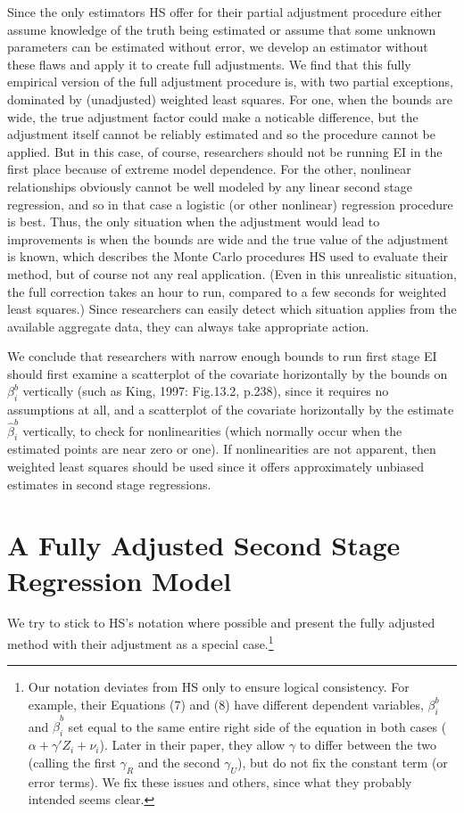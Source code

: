 \documentclass[11pt,titlepage]{article}
\begin{document}
Since the only estimators HS offer for their partial adjustment
procedure either assume knowledge of the truth being estimated or
assume that some unknown parameters can be estimated without error, we
develop an estimator without these flaws and apply it to create full
adjustments.  We find that this fully empirical version of the full
adjustment procedure is, with two partial exceptions, dominated by
(unadjusted) weighted least squares.  For one, when the bounds are
wide, the true adjustment factor could make a noticable difference,
but the adjustment itself cannot be reliably estimated and so the
procedure cannot be applied.  But in this case, of course, researchers
should not be running EI in the first place because of extreme model
dependence.  For the other, nonlinear relationships obviously cannot
be well modeled by any linear second stage regression, and so in that
case a logistic (or other nonlinear) regression procedure is best.
Thus, the only situation when the adjustment would lead to
improvements is when the bounds are wide and the true value of the
adjustment is known, which describes the Monte Carlo procedures HS
used to evaluate their method, but of course not any real application.
(Even in this unrealistic situation, the full correction takes an hour
to run, compared to a few seconds for weighted least squares.)  Since
researchers can easily detect which situation applies from the
available aggregate data, they can always take appropriate action.

We conclude that researchers with narrow enough bounds to run first
stage EI should first examine a scatterplot of the covariate
horizontally by the bounds on $\beta_i^b$ vertically (such as King,
1997: Fig.13.2, p.238), since it requires no assumptions at all, and a
scatterplot of the covariate horizontally by the estimate
$\hat\beta_i^b$ vertically, to check for nonlinearities (which
normally occur when the estimated points are near zero or one).  If
nonlinearities are not apparent, then weighted least squares should be
used since it offers approximately unbiased estimates in second stage
regressions.

\section{A Fully Adjusted Second Stage Regression Model}
\label{s:fulladj}

We try to stick to HS's notation where possible and present the fully
adjusted method with their adjustment as a special case.\footnote{Our
  notation deviates from HS only to ensure logical consistency.  For
  example, their Equations (7) and (8) have different dependent
  variables, $\beta_i^b$ and $\hat\beta_i^b$ set equal to the same
  entire right side of the equation in both cases
  ($\alpha+\gamma'Z_i+\nu_i$).  Later in their paper, they allow
  $\gamma$ to differ between the two (calling the first $\gamma_R$ and
  the second $\gamma_U$), but do not fix the constant term (or error
  terms).  We fix these issues and others, since what they probably
  intended seems clear.}
\end{document}
